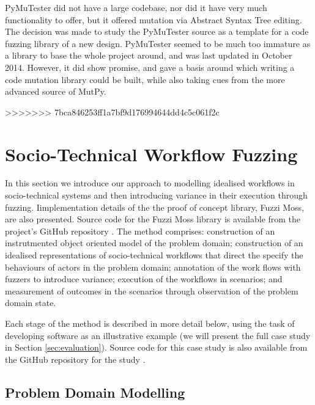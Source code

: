 \documentclass{sig-alternate}
\begin{document}
PyMuTester did not have a large codebase\cite{GitHu12:online}, nor did it have very much functionality to offer, but it offered mutation via Abstract Syntax Tree editing. The decision was made to study the PyMuTester source as a template for a code fuzzing library of a new design. PyMuTester seemed to be much too immature as a library to base the whole project around, and was last updated in October 2014. However, it did show promise, and gave a basis around which writing a code mutation library could be built, while also taking cues from the more advanced source of MutPy\cite{khala8:online}. \par
>>>>>>> 7bca846253ff1a7bf9d176994644dd4c5c061f2c



\section{Socio-Technical Workflow Fuzzing}


In this section we introduce our approach to modelling idealised workflows in
socio-technical systems and then introducing variance in their execution through
fuzzing.  Iimplementation details of the the proof of concept library, Fuzzi
Moss, are also presented.  Source code for the Fuzzi Moss library is available
from the project's GitHub repository \citep{storer2016fuzzi-moss-scm-repo}.  The
method comprises: construction of an instrutmented object oriented model of the
problem domain; construction of an idealised representations of socio-technical
workflows that direct the specify the behaviours of actors in the problem
domain; annotation of the work flows with fuzzers to introduce variance;
execution of the workflows in scenarios; and measurement of outcomes in the
scenarios through observation of the problem domain state.

Each stage of the method is described in more detail below, using the task of
developing software as an illustrative example (we will present the full case
study in Section \ref{sec:evaluation}). Source code for this case study is also
available from the GitHub repository for the study
\citep{storer2016softdev-workflow-scm}.


\subsection{Problem Domain Modelling}
\end{document}
